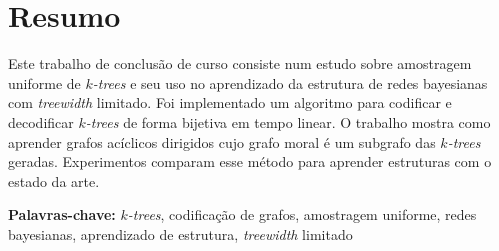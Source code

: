 \chapter*{Resumo}

Este trabalho de conclusão de curso consiste num estudo sobre amostragem uniforme de \emph{$k$-trees} e seu uso no aprendizado da estrutura de redes bayesianas com \emph{treewidth} limitado. Foi implementado um algoritmo para codificar e decodificar \emph{$k$-trees} de forma bijetiva em tempo linear. O trabalho mostra como aprender grafos acíclicos dirigidos cujo grafo moral é um subgrafo das \emph{$k$-trees} geradas. Experimentos comparam esse método para aprender estruturas com o estado da arte.

\vspace{1em}

\noindent \textbf{Palavras-chave:} \emph{$k$-trees}, codificação de grafos, amostragem uniforme, redes bayesianas, aprendizado de estrutura, \emph{treewidth} limitado
